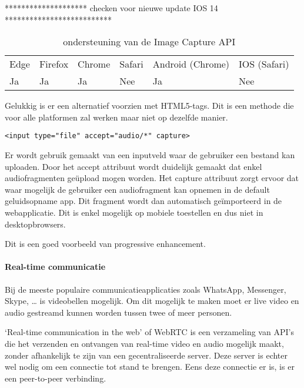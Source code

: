 ******************** checken voor nieuwe update IOS 14 **************************

\begin{table}[]
	\begin{tabular}{llllll}
		Edge & Firefox & Chrome & Safari & Android (Chrome) & IOS (Safari) \\
		Ja   & Ja      & Ja     & Nee     & Ja               & Nee          
	\end{tabular}	
	\caption{ondersteuning van de Image Capture API}
	\label{ondersteuning van de Image Capture API}
\end{table}

Gelukkig is er een alternatief voorzien met HTML5-tags. Dit is een methode die voor alle platformen zal werken maar niet op dezelfde manier.

\begin{lstlisting}
<input type="file" accept="audio/*" capture>
\end{lstlisting}

Er wordt gebruik gemaakt van een inputveld waar de gebruiker een bestand kan uploaden. Door het accept attribuut wordt duidelijk gemaakt dat enkel audiofragmenten geüpload mogen worden. Het capture attribuut zorgt ervoor dat waar mogelijk de gebruiker een audiofragment kan opnemen in de default geluidsopname app. Dit fragment wordt dan automatisch geïmporteerd in de webapplicatie. Dit is enkel mogelijk op mobiele toestellen en dus niet in desktopbrowsers.

\autocite{Kinlan2019}

Dit is een goed voorbeeld van progressive enhancement. 



\paragraph{Real-time communicatie }

Bij de meeste populaire communicatieapplicaties zoals WhatsApp, Messenger, Skype, … is videobellen mogelijk. Om dit mogelijk te maken moet er live video en audio gestreamd kunnen worden tussen twee of meer personen.

‘Real-time communication in the web’ of WebRTC \autocite{Jennings2020} is een verzameling van API’s die het verzenden en ontvangen van real-time video en audio mogelijk maakt, zonder afhankelijk te zijn van een gecentraliseerde server. Deze server is echter wel nodig om een connectie tot stand te brengen. Eens deze connectie er is, is er een peer-to-peer verbinding.

